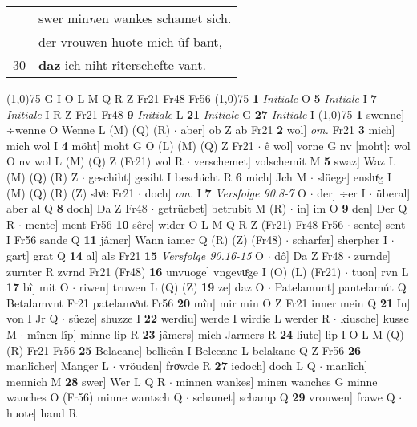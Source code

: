 \documentclass[8pt,a4paper,notitlepage]{article}
\begin{document}
\begin{table}[ht]
\begin{minipage}[t]{0.5\linewidth}
\begin{tabular}{rl}
 & swer min\textit{n}en wankes schamet sich.\\ 
 & der vrouwen huote mich ûf bant,\\ 
30 & \textbf{daz} ich niht rîterschefte vant.\\ 
\end{tabular}
\scriptsize
\line(1,0){75} \newline
G I O L M Q R Z Fr21 Fr48 Fr56 \newline
\line(1,0){75} \newline
\textbf{1} \textit{Initiale} O  \textbf{5} \textit{Initiale} I  \textbf{7} \textit{Initiale} I R Z Fr21 Fr48  \textbf{9} \textit{Initiale} L  \textbf{21} \textit{Initiale} G  \textbf{27} \textit{Initiale} I  \newline
\line(1,0){75} \newline
\textbf{1} swenne] ÷wenne O Wenne L (M) (Q) (R)  $\cdot$ aber] ob Z ab Fr21 \textbf{2} wol] \textit{om.} Fr21 \textbf{3} mich] mich wol I \textbf{4} möht] moht G O (L) (M) (Q) Z Fr21  $\cdot$ ê wol] vorne G nv [moht]: wol O nv wol L (M) (Q) Z (Fr21) wol R  $\cdot$ verschemet] volschemit M \textbf{5} swaz] Waz L (M) (Q) (R) Z  $\cdot$ geschiht] gesiht I beschicht R \textbf{6} mich] Jch M  $\cdot$ slüege] ensluͤg I (M) (Q) (R) (Z) slvͦc Fr21  $\cdot$ doch] \textit{om.} I \textbf{7} \textit{Versfolge 90.8-7} O   $\cdot$ der] ÷er I  $\cdot$ überal] aber al Q \textbf{8} doch] Da Z Fr48  $\cdot$ getrüebet] betrubit M (R)  $\cdot$ in] im O \textbf{9} den] Der Q R  $\cdot$ mente] ment Fr56 \textbf{10} sêre] wider O L M Q R Z (Fr21) Fr48 Fr56  $\cdot$ sente] sent I Fr56 sande Q \textbf{11} jâmer] Wann iamer Q (R) (Z) (Fr48)  $\cdot$ scharfer] sherpher I  $\cdot$ gart] grat Q \textbf{14} al] als Fr21 \textbf{15} \textit{Versfolge 90.16-15} O   $\cdot$ dô] Da Z Fr48  $\cdot$ zurnde] zurnter R zvrnd Fr21 (Fr48) \textbf{16} unvuoge] vngevuͤge I (O) (L) (Fr21)  $\cdot$ tuon] rvn L \textbf{17} bî] mit O  $\cdot$ riwen] truwen L (Q) (Z) \textbf{19} ze] daz O  $\cdot$ Patelamunt] pantelamút Q Betalamvnt Fr21 patelamvͦnt Fr56 \textbf{20} mîn] mir min O Z Fr21 inner mein Q \textbf{21} In] von I Jr Q  $\cdot$ süeze] shuzze I \textbf{22} werdiu] werde I wirdie L werder R  $\cdot$ kiusche] kusse M  $\cdot$ mînen lîp] minne lip R \textbf{23} jâmers] mich Jarmers R \textbf{24} liute] lip I O L M (Q) (R) Fr21 Fr56 \textbf{25} Belacane] bellicân I Belecane L belakane Q Z Fr56 \textbf{26} manlîcher] Manger L  $\cdot$ vröuden] froͯwde R \textbf{27} iedoch] doch L Q  $\cdot$ manlîch] mennich M \textbf{28} swer] Wer L Q R  $\cdot$ minnen wankes] minen wanches G minne wanches O (Fr56) minne wantsch Q  $\cdot$ schamet] schamp Q \textbf{29} vrouwen] frawe Q  $\cdot$ huote] hand R \newline

\end{minipage}
\end{table}
\end{document}

